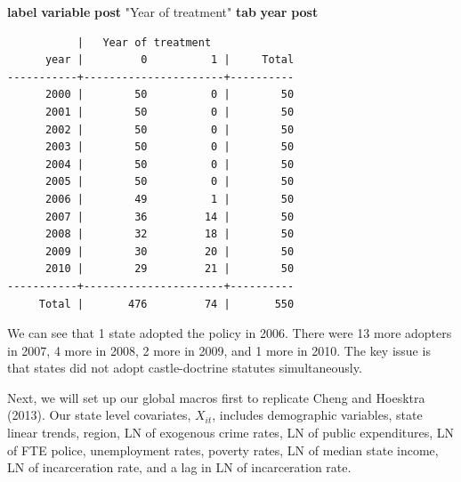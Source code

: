 \documentclass[
]{book}
\newenvironment{Shaded}{\begin{snugshade}}{\end{snugshade}}
\newcommand{\CommentTok}[1]{\textcolor[rgb]{0.56,0.35,0.01}{\textit{#1}}}
\newcommand{\FunctionTok}[1]{\textcolor[rgb]{0.13,0.29,0.53}{\textbf{#1}}}
\newcommand{\KeywordTok}[1]{\textcolor[rgb]{0.13,0.29,0.53}{\textbf{#1}}}
\newcommand{\NormalTok}[1]{#1}
\newcommand{\OtherTok}[1]{\textcolor[rgb]{0.56,0.35,0.01}{#1}}
\newcommand{\StringTok}[1]{\textcolor[rgb]{0.31,0.60,0.02}{#1}}
\begin{document}
\begin{Shaded}
\begin{Highlighting}[]
\KeywordTok{label} \KeywordTok{variable} \KeywordTok{post} \StringTok{"Year of treatment"}
\KeywordTok{tab} \FunctionTok{year} \KeywordTok{post}
\end{Highlighting}
\end{Shaded}

\begin{verbatim}
           |   Year of treatment
      year |         0          1 |     Total
-----------+----------------------+----------
      2000 |        50          0 |        50 
      2001 |        50          0 |        50 
      2002 |        50          0 |        50 
      2003 |        50          0 |        50 
      2004 |        50          0 |        50 
      2005 |        50          0 |        50 
      2006 |        49          1 |        50 
      2007 |        36         14 |        50 
      2008 |        32         18 |        50 
      2009 |        30         20 |        50 
      2010 |        29         21 |        50 
-----------+----------------------+----------
     Total |       476         74 |       550 
\end{verbatim}

We can see that 1 state adopted the policy in 2006. There were 13 more adopters in 2007, 4 more in 2008, 2 more in 2009, and 1 more in 2010. The key issue is that states did not adopt castle-doctrine statutes simultaneously.

Next, we will set up our global macros first to replicate Cheng and Hoesktra (2013). Our state level covariates, \(X_{it}\), includes demographic variables, state linear trends, region, LN of exogenous crime rates, LN of public expenditures, LN of FTE police, unemployment rates, poverty rates, LN of median state income, LN of incarceration rate, and a lag in LN of incarceration rate.

\begin{Shaded}
\end{Shaded}
\end{document}
